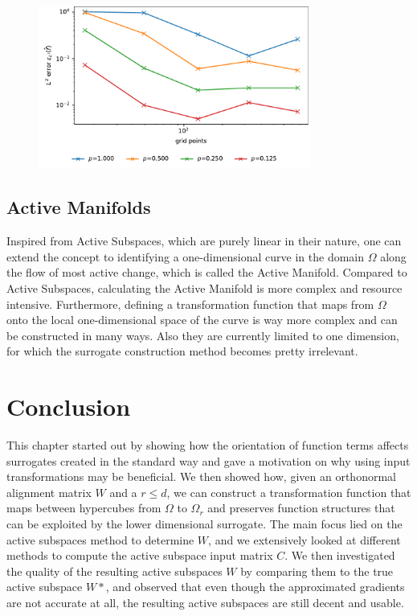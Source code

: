 \documentclass[
  a4paper,  %
  twoside,  %
  bibliography=totoc,
  headsepline,
  cleardoublepage=empty,
  parskip=half,
  draft=false
]{scrbook}
\begin{document}
\begin{figure}[H]
\centering
\includegraphics[width=0.8\textwidth]{graphics/periodic}
\label{fig:periodic}
\end{figure}

\subsection{Active Manifolds}

Inspired from Active Subspaces, which are purely linear in their nature, one can extend the concept to identifying a one-dimensional curve in the domain $\Omega$ along the flow of most active change, which is called the Active Manifold.
Compared to Active Subspaces, calculating the Active Manifold is more complex and resource intensive.
Furthermore, defining a transformation function that maps from $\Omega$ onto the local one-dimensional space of the curve is way more complex and can be constructed in many ways.
Also they are currently limited to one dimension, for which the surrogate construction method becomes pretty irrelevant.

\section{Conclusion}

This chapter started out by showing how the orientation of function terms affects surrogates created in the standard way and gave a motivation on why using input transformations may be beneficial.
We then showed how, given an orthonormal alignment matrix $W$ and a $r \leq d$, we can construct a transformation function that maps between hypercubes from $\Omega$ to $\Omega_r$ and preserves function structures that can be exploited by the lower dimensional surrogate.
The main focus lied on the active subspaces method to determine $W$, and we extensively looked at different methods to compute the active subspace input matrix $C$.
We then investigated the quality of the resulting active subspaces $W$ by comparing them to the true active subspace $W*$, and observed that even though the approximated gradients are not accurate at all, the resulting active subspaces are still decent and usable.
\end{document}
